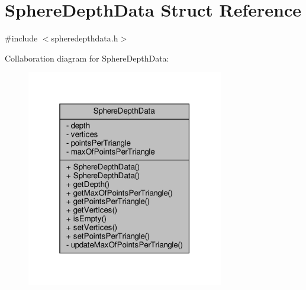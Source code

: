 \hypertarget{struct_sphere_depth_data}{}\section{Sphere\+Depth\+Data Struct Reference}
\label{struct_sphere_depth_data}


{\ttfamily \#include $<$spheredepthdata.\+h$>$}



Collaboration diagram for Sphere\+Depth\+Data\+:\nopagebreak
\begin{figure}[H]
\begin{center}
\leavevmode
\includegraphics[width=244pt]{struct_sphere_depth_data__coll__graph}
\end{center}
\end{figure}
